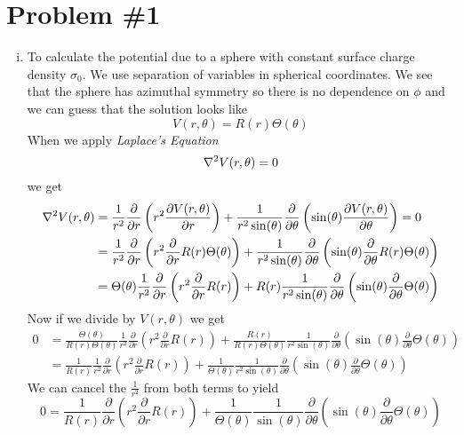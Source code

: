 \documentclass[11pt]{article}
\numberwithin{equation}{section}
\newcommand{\grad}{\bold\nabla}
\begin{document}


\section{Problem \#1}
\begin{enumerate}[(i)]
\item
To calculate the potential due to a sphere with constant surface charge density $\sigma_0$. We use separation of variables in spherical coordinates. We see that the sphere has azimuthal symmetry so there is no dependence on $\phi$ and we can guess that the solution looks like
$$V(r,\theta) = R(r)\Theta(\theta)$$
When we apply \emph{Laplace's Equation}
$$\grad^2V(r,\theta)=0$$
we get
\begin{align*}
\grad^2V(r,\theta) &= \frac{1}{r^2}\frac{\partial}{\partial r}\left(r^2\frac{\partial V(r,\theta)}{\partial r}\right) + \frac{1}{r^2\sin(\theta)}\frac{\partial}{\partial \theta}\left(\sin(\theta)\frac{\partial V(r,\theta)}{\partial \theta}\right) = 0\\ 
&=\frac{1}{r^2}\frac{\partial}{\partial r}\left(r^2\frac{\partial }{\partial r}R(r)\Theta(\theta)\right) + \frac{1}{r^2\sin(\theta)}\frac{\partial}{\partial \theta}\left(\sin(\theta)\frac{\partial}{\partial \theta}R(r)\Theta(\theta)\right)\\
&=\Theta(\theta)\frac{1}{r^2}\frac{\partial}{\partial r}\left(r^2\frac{\partial }{\partial r}R(r)\right) + R(r)\frac{1}{r^2\sin(\theta)}\frac{\partial}{\partial \theta}\left(\sin(\theta)\frac{\partial}{\partial \theta}\Theta(\theta)\right)
\end{align*}
Now if we divide by $V(r,\theta)$ we get
\begin{align*}
0&=\frac{\Theta(\theta)}{R(r)\Theta(\theta)}\frac{1}{r^2}\frac{\partial}{\partial r}\left(r^2\frac{\partial }{\partial r}R(r)\right) + \frac{R(r)}{R(r)\Theta(\theta)}\frac{1}{r^2\sin(\theta)}\frac{\partial}{\partial \theta}\left(\sin(\theta)\frac{\partial}{\partial \theta}\Theta(\theta)\right)\\
&=\frac{1}{R(r)}\frac{1}{r^2}\frac{\partial}{\partial r}\left(r^2\frac{\partial }{\partial r}R(r)\right) + \frac{1}{\Theta(\theta)}\frac{1}{r^2\sin(\theta)}\frac{\partial}{\partial \theta}\left(\sin(\theta)\frac{\partial}{\partial \theta}\Theta(\theta)\right)
\end{align*}
We can cancel the $\frac{1}{r^2}$ from both terms to yield
$$0=\frac{1}{R(r)}\frac{\partial}{\partial r}\left(r^2\frac{\partial }{\partial r}R(r)\right) + \frac{1}{\Theta(\theta)}\frac{1}{\sin(\theta)}\frac{\partial}{\partial \theta}\left(\sin(\theta)\frac{\partial}{\partial \theta}\Theta(\theta)\right)$$ 

\end{enumerate}
\end{document}
